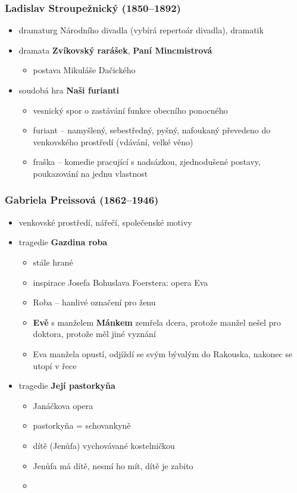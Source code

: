 \subsubsection{Ladislav Stroupežnický (1850--1892)}
\begin{itemize}
\item dramaturg Národního divadla (vybírá repertoár divadla), dramatik
\item dramata \textbf{Zvíkovský rarášek}, \textbf{Paní Mincmistrová}
	\begin{itemize}
	\item postava Mikuláše Dačického
	\end{itemize}
\item soudobá hra \textbf{Naši furianti}
	\begin{itemize}	
	\item vesnický spor o zastávání funkce obecního ponocného
	\item furiant -- namyšlený, sebestředný, pyšný, nafoukaný \ra převedeno do venkovského prostředí (vdávání, velké věno)
	\item fraška -- komedie pracující s nadsázkou, zjednodušené postavy, poukazování na jednu vlastnost
	\end{itemize}
\end{itemize}

\subsubsection{Gabriela Preissová (1862--1946)}
\begin{itemize}
\item venkovské prostředí, nářečí, společenské motivy
\item tragedie \textbf{Gazdina roba}
	\begin{itemize}
	\item stále hrané
	\item inspirace Josefa Bohuslava Foerstera: opera Eva
	\item Roba -- hanlivé označení pro ženu
	\item \textbf{Evě} s manželem \textbf{Mánkem} zemřela dcera, protože manžel nešel pro doktora, protože měl jiné vyznání
	\item Eva manžela opustí, odjíždí se svým bývalým do Rakouska, nakonec se utopí v řece
	\end{itemize}
\item tragedie \textbf{Její pastorkyňa}
	\begin{itemize}
	\item Janáčkova opera
	\item pastorkyňa = schovankyně
	\item dítě (Jenůfa) vychovávané kostelničkou
	\item Jenůfa má dítě, nesmí ho mít, dítě je zabito
	\item 
	\end{itemize}
\end{itemize}

